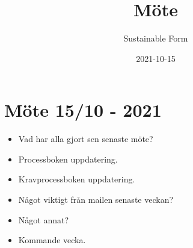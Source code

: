 \documentclass{article}
\title{Möte}
\author{Sustainable Form}
\date{2021-10-15}
\begin{document}
\maketitle

\section{Möte 15/10 - 2021}

\begin{itemize}
    \item Vad har alla gjort sen senaste möte?
    
     \item Processboken uppdatering.
      
     \item Kravprocessboken uppdatering.
     
     \item Något viktigt från mailen senaste veckan?
     
     \item Något annat?
     
    \item Kommande vecka.
    
\end{itemize}
\end{document}
